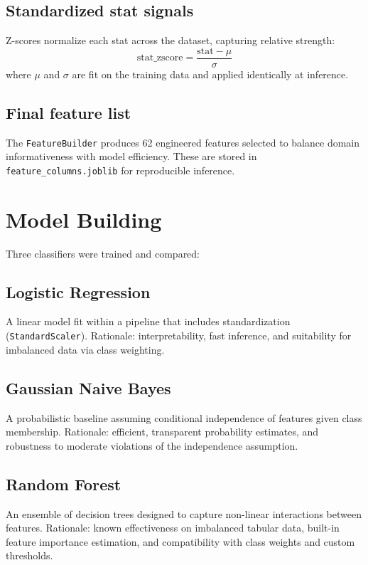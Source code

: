 \subsection{Standardized stat signals}

Z-scores normalize each stat across the dataset, capturing relative strength:
\[
  \text{stat\_zscore} = \frac{\text{stat} - \mu}{\sigma}
\]
where $\mu$ and $\sigma$ are fit on the training data and applied identically at inference.

\subsection{Final feature list}

The \texttt{FeatureBuilder} produces 62 engineered features selected to balance domain informativeness with model efficiency. These are stored in \texttt{feature\_columns.joblib} for reproducible inference.

\section{Model Building}
\label{sec:model_building}

Three classifiers were trained and compared:

\subsection{Logistic Regression}

A linear model fit within a pipeline that includes standardization (\texttt{StandardScaler}). Rationale: interpretability, fast inference, and suitability for imbalanced data via class weighting.

\subsection{Gaussian Naive Bayes}

A probabilistic baseline assuming conditional independence of features given class membership. Rationale: efficient, transparent probability estimates, and robustness to moderate violations of the independence assumption.

\subsection{Random Forest}

An ensemble of decision trees designed to capture non-linear interactions between features. Rationale: known effectiveness on imbalanced tabular data, built-in feature importance estimation, and compatibility with class weights and custom thresholds.

